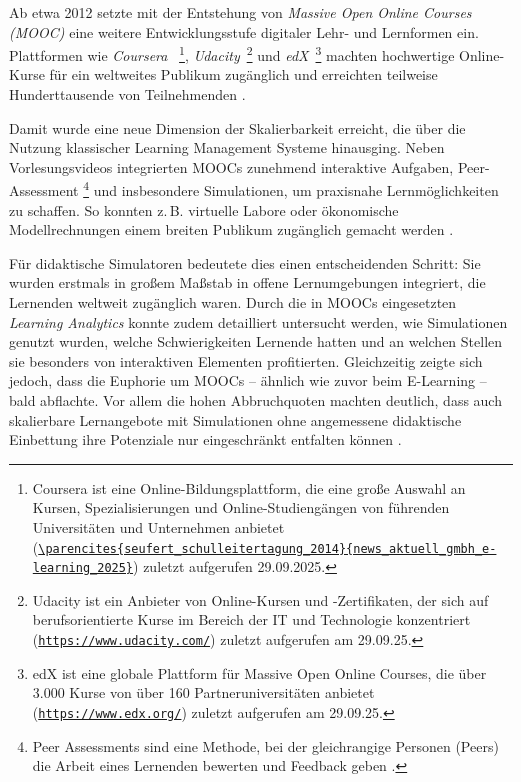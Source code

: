 Ab etwa 2012 setzte mit der Entstehung von \textit{Massive Open Online Courses (MOOC)} eine weitere Entwicklungsstufe digitaler Lehr- und Lernformen ein. Plattformen wie \textit{Coursera} ~\footnote{Coursera ist eine Online-Bildungsplattform, die eine große Auswahl an Kursen, Spezialisierungen und Online-Studiengängen von führenden Universitäten und Unternehmen anbietet (\href{https://www.coursera.org/}{\nolinkurl{\parencites{seufert_schulleitertagung_2014}{news_aktuell_gmbh_e-learning_2025}}}) zuletzt aufgerufen 29.09.2025.}, \textit{Udacity}~\footnote{Udacity ist ein Anbieter von Online-Kursen und -Zertifikaten, der sich auf berufsorientierte Kurse im Bereich der IT und Technologie konzentriert (\href{https://www.udacity.com/)}{\nolinkurl{https://www.udacity.com/}}) zuletzt aufgerufen am 29.09.25.} und \textit{edX}~\footnote{edX ist eine globale Plattform für Massive Open Online Courses, die über 3.000 Kurse von über 160 Partneruniversitäten anbietet (\href{https://www.edx.org/)}{\nolinkurl{https://www.edx.org/}}) zuletzt aufgerufen am 29.09.25.} machten hochwertige Online-Kurse für ein weltweites Publikum zugänglich und erreichten teilweise Hunderttausende von Teilnehmenden \cite{pappano_year_2012}.

Damit wurde eine neue Dimension der Skalierbarkeit erreicht, die über die Nutzung klassischer Learning Management Systeme hinausging. Neben Vorlesungsvideos integrierten MOOCs zunehmend interaktive Aufgaben, Peer-Assessment \footnote{Peer Assessments sind eine Methode, bei der gleichrangige Personen (Peers) die Arbeit eines Lernenden bewerten und Feedback geben \cite{tum_wenn_2022}.} und insbesondere Simulationen, um praxisnahe Lernmöglichkeiten zu schaffen. So konnten z.\,B. virtuelle Labore oder ökonomische Modellrechnungen einem breiten Publikum zugänglich gemacht werden \parencite[S.~5f]{yuan_moocs_2013}.

Für didaktische Simulatoren bedeutete dies einen entscheidenden Schritt: Sie wurden erstmals in großem Maßstab in offene Lernumgebungen integriert, die Lernenden weltweit zugänglich waren.  Durch die in MOOCs eingesetzten \textit{Learning Analytics} konnte zudem detailliert untersucht werden, wie Simulationen genutzt wurden, welche Schwierigkeiten Lernende hatten und an welchen Stellen sie besonders von interaktiven Elementen profitierten. Gleichzeitig zeigte sich jedoch, dass die Euphorie um MOOCs – ähnlich wie zuvor beim E-Learning – bald abflachte. Vor allem die hohen Abbruchquoten machten deutlich, dass auch skalierbare Lernangebote mit Simulationen ohne angemessene didaktische Einbettung ihre Potenziale nur eingeschränkt entfalten können \parencite[S.~1242]{khalil_moocs_2014}. 

